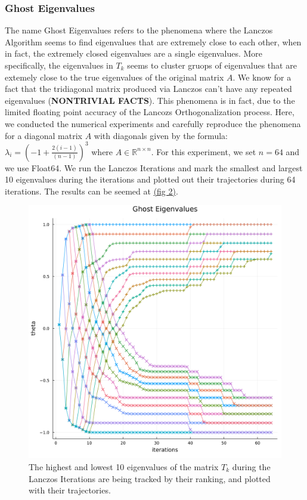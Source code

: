 \documentclass[]{article}
\theoremstyle{definition}
\begin{document}
        \subsubsection{Ghost Eigenvalues}
            The name Ghost Eigenvalues refers to the phenomena where the Lanczos Algorithm seems to find eigenvalues that are extremely close to each other, when in fact, the extremely closed eigenvalues are a single eigenvalues. More specifically, the eigenvalues in $T_k$ seems to cluster gruops of eigenvalues that are extemely close to the true eigenvalues of the original matrix $A$. We know for a fact that the tridiagonal matrix produced via Lanczos can't have any repeated eigenvalues (\textbf{NONTRIVIAL FACTS}). This phenomena is in fact, due to the limited floating point accuracy of the Lancozs Orthogonalization process. Here, we conducted the numerical experiments and carefully reproduce the phenomena for a diagonal matrix $A$ with diagonals given by the formula: $\lambda_i = \left(-1 + \frac{2(i - 1)}{(n - 1)}\right)^3$ where $A\in \mathbb R^{n\times n}$. For this experiment, we set $n = 64$ and we use Float64. We run the Lanczos Iterations and mark the smallest and largest 10 eigenvalues during the iterations and plotted out their trajectories during 64 iterations. The results can be seemed at \hyperref[fig:2]{(fig 2)}. 
            \begin{figure}[H]\label{fig:2}
                \centering
                \includegraphics[width=14cm]{fig2.png}
                \caption{The highest and lowest 10 eigenvalues of the matrix $T_k$ during the Lanczos Iterations are being tracked by their ranking, and plotted with their trajectories. }
            \end{figure}
\end{document}
